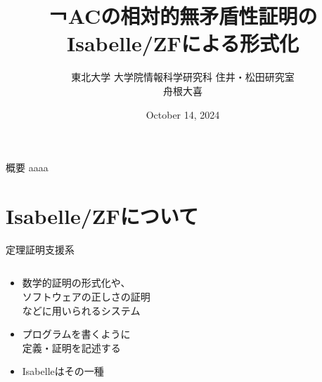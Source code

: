 \documentclass[17pt,aspectratio=169]{beamer}
\title{￢ACの相対的無矛盾性証明のIsabelle/ZFによる形式化}
\author{東北大学 大学院情報科学研究科 住井・松田研究室 \\ 舟根大喜}
\date{October 14, 2024}
\begin{document}
\maketitle

\begin{frame}{概要}
    aaaa
\end{frame}

\section{Isabelle/ZFについて}

\begin{frame}{定理証明支援系}
    \begin{columns}
        \begin{column}{0.65\textwidth}
            \begin{itemize}[itemsep=7pt]
                \item 数学的証明の形式化や、\\ソフトウェアの正しさの証明\\などに用いられるシステム
                \item プログラムを書くように\\定義・証明を記述する
                \item Isabelleはその一種
            \end{itemize}


\end{column}
\end{columns}
\end{frame}
\end{document}
